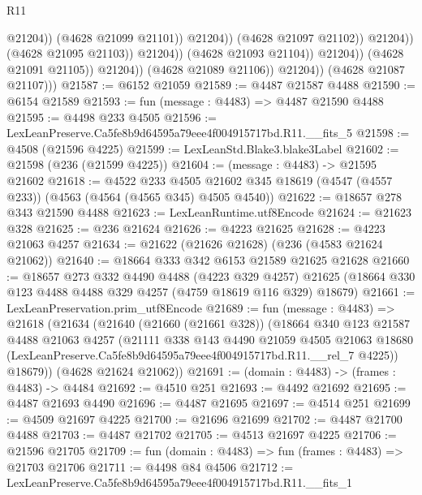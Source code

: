 \begin{lexlean}{R11}
\begin{coremodule}
                                                @21204))
                                            (@4628 @21099 @21101))
                                          @21204))
                                      (@4628 @21097 @21102))
                                    @21204))
                                (@4628 @21095 @21103))
                              @21204))
                          (@4628 @21093 @21104))
                        @21204))
                    (@4628 @21091 @21105))
                  @21204))
              (@4628 @21089 @21106))
            @21204))
        (@4628 @21087 @21107)))
@21587 := @6152 @21059
@21589 := @4487 @21587 @4488
@21590 := @6154 @21589
@21593 := fun (message : @4483) => @4487 @21590 @4488
@21595 := @4498 @233 @4505
@21596 := LexLeanPreserve.Ca5fe8b9d64595a79eee4f004915717bd.R11.__fits_5
@21598 := @4508 (@21596 @4225)
@21599 := LexLeanStd.Blake3.blake3Label
@21602 := @21598 (@236 (@21599 @4225))
@21604 := (message : @4483) -> @21595 @21602
@21618 := @4522
    @233
    @4505
    @21602
    @345
    @18619
    (@4547 (@4557 @233))
    (@4563 (@4564 (@4565 @345) @4505 @4540))
@21622 := @18657 @278 @343 @21590 @4488
@21623 := LexLeanRuntime.utf8Encode
@21624 := @21623 @328
@21625 := @236 @21624
@21626 := @4223 @21625
@21628 := @4223 @21063 @4257
@21634 := @21622 (@21626 @21628) (@236 (@4583 @21624 @21062))
@21640 := @18664 @333 @342 @6153 @21589 @21625 @21628
@21660 := @18657
    @273
    @332
    @4490
    @4488
    (@4223 @329 @4257)
    @21625
    (@18664 @330 @123 @4488 @4488 @329 @4257 (@4759 @18619 @116 @329) @18679)
@21661 := LexLeanPreservation.prim_utf8Encode
@21689 := fun (message : @4483) =>
  @21618
    (@21634
      (@21640
        (@21660 (@21661 @328))
        (@18664
          @340
          @123
          @21587
          @4488
          @21063
          @4257
          (@21111
            @338
            @143
            @4490
            @21059
            @4505
            @21063
            @18680
            (LexLeanPreserve.Ca5fe8b9d64595a79eee4f004915717bd.R11.__rel_7 @4225))
          @18679))
      (@4628 @21624 @21062))
@21691 := (domain : @4483) -> (frames : @4483) -> @4484
@21692 := @4510 @251
@21693 := @4492 @21692
@21695 := @4487 @21693 @4490
@21696 := @4487 @21695
@21697 := @4514 @251
@21699 := @4509 @21697 @4225
@21700 := @21696 @21699
@21702 := @4487 @21700 @4488
@21703 := @4487 @21702
@21705 := @4513 @21697 @4225
@21706 := @21596 @21705
@21709 := fun (domain : @4483) => fun (frames : @4483) => @21703 @21706
@21711 := @4498 @84 @4506
@21712 := LexLeanPreserve.Ca5fe8b9d64595a79eee4f004915717bd.R11.__fits_1

\end{coremodule}
\end{lexlean}
